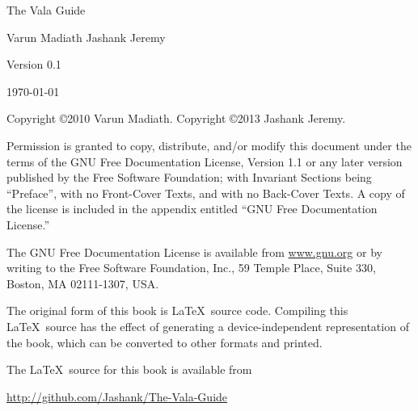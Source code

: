 \documentclass[openany]{book}
\begin{document}
\pagebreak
\thispagestyle{empty}

\begin{flushright}
\vspace*{2.5in}

{\huge The Vala Guide}

\vspace{1in}

{\Large
Varun Madiath
Jashank Jeremy
}


\vspace{1in}

{\Large Version 0.1}

{\small \today}

\vfill

\end{flushright}

\pagebreak
\thispagestyle{empty}

Copyright \copyright 2010 Varun Madiath.
Copyright \copyright 2013 Jashank Jeremy.

\vspace{0.25in}

Permission is granted to copy, distribute, and/or modify this document
under the terms of the GNU Free Documentation License, Version 1.1 or
any later version published by the Free Software Foundation; with
Invariant Sections being ``Preface'', with no Front-Cover Texts, and
with no Back-Cover Texts.  A copy of the license is included in the
appendix entitled ``GNU Free Documentation License.''

The GNU Free Documentation License is available from \url{www.gnu.org}
or by writing to the Free Software Foundation, Inc., 59 Temple Place,
Suite 330, Boston, MA 02111-1307, USA.

The original form of this book is \LaTeX\ source code.  Compiling this
\LaTeX\ source has the effect of generating a device-independent
representation of the book, which can be converted to other formats
and printed.

The \LaTeX\ source for this book is available from

\hspace{0.25in}\url{http://github.com/Jashank/The-Vala-Guide}

\vspace{0.25in}

\fontsize{12pt}{18pt}\selectfont
\tableofcontents



\end{document}

